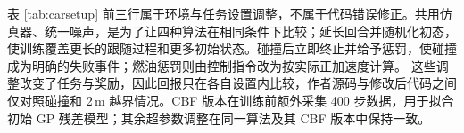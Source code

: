 \documentclass[UTF8,a4paper,zihao=-4,fontset=fandol]{ctexart}
\begin{document}
表 \ref{tab:carsetup} 前三行属于环境与任务设置调整，不属于代码错误修正。共用仿真器、统一噪声，是为了让四种算法在相同条件下比较；延长回合并随机化初态，使训练覆盖更长的跟随过程和更多初始状态。碰撞后立即终止并给予惩罚，使碰撞成为明确的失败事件；燃油惩罚则由控制指令改为按实际正加速度计算。
这些调整改变了任务与奖励，因此回报只在各自设置内比较，作者源码与修改后代码之间仅对照碰撞和 2\,m 越界情况。CBF 版本在训练前额外采集 400 步数据，用于拟合初始 GP 残差模型；其余超参数调整在同一算法及其 CBF 版本中保持一致。
\end{document}
